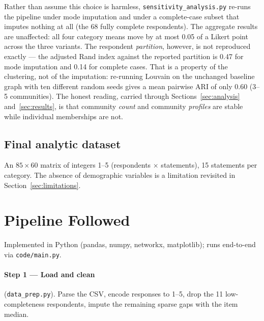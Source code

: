\documentclass[11pt,a4paper]{article}
\begin{document}
Rather than assume this choice is harmless, \texttt{sensitivity\_analysis.py} re-runs the pipeline under mode imputation and under a complete-case subset that imputes nothing at all (the 68 fully complete respondents). The aggregate results are unaffected: all four category means move by at most 0.05 of a Likert point across the three variants. The respondent \emph{partition}, however, is not reproduced exactly --- the adjusted Rand index against the reported partition is 0.47 for mode imputation and 0.14 for complete cases. That is a property of the clustering, not of the imputation: re-running Louvain on the unchanged baseline graph with ten different random seeds gives a mean pairwise ARI of only 0.60 (3--5 communities). The honest reading, carried through Sections~\ref{sec:analysis} and~\ref{sec:results}, is that community \emph{count} and community \emph{profiles} are stable while individual memberships are not.

\subsection{Final analytic dataset}
An $85 \times 60$ matrix of integers 1--5 (respondents $\times$ statements), 15 statements per category. The absence of demographic variables is a limitation revisited in Section~\ref{sec:limitations}.

\section{Pipeline Followed}
Implemented in Python (pandas, numpy, networkx, matplotlib); runs end-to-end via \texttt{code/main.py}.

\paragraph{Step 1 --- Load and clean} (\texttt{data\_prep.py}). Parse the CSV, encode responses to 1--5, drop the 11 low-completeness respondents, impute the remaining sparse gaps with the item median.
\end{document}
